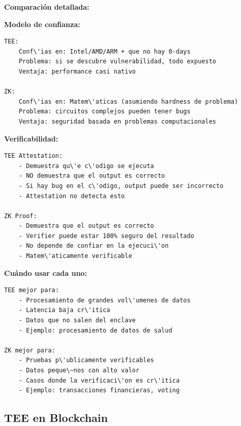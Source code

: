 \documentclass[11pt,a4paper,twoside]{book}
\begin{document}
\begin{keyidea}
\textbf{Comparaci\'on detallada:}

\textbf{Modelo de confianza:}
\begin{verbatim}
TEE:
    Conf\'ias en: Intel/AMD/ARM + que no hay 0-days
    Problema: si se descubre vulnerabilidad, todo expuesto
    Ventaja: performance casi nativo

ZK:
    Conf\'ias en: Matem\'aticas (asumiendo hardness de problema)
    Problema: circuitos complejos pueden tener bugs
    Ventaja: seguridad basada en problemas computacionales
\end{verbatim}

\textbf{Verificabilidad:}
\begin{verbatim}
TEE Attestation:
    - Demuestra qu\'e c\'odigo se ejecuta
    - NO demuestra que el output es correcto
    - Si hay bug en el c\'odigo, output puede ser incorrecto
    - Attestation no detecta esto

ZK Proof:
    - Demuestra que el output es correcto
    - Verifier puede estar 100% seguro del resultado
    - No depende de confiar en la ejecuci\'on
    - Matem\'aticamente verificable
\end{verbatim}

\textbf{Cu\'ando usar cada uno:}
\begin{verbatim}
TEE mejor para:
    - Procesamiento de grandes vol\'umenes de datos
    - Latencia baja cr\'itica
    - Datos que no salen del enclave
    - Ejemplo: procesamiento de datos de salud

ZK mejor para:
    - Pruebas p\'ublicamente verificables
    - Datos peque\~nos con alto valor
    - Casos donde la verificaci\'on es cr\'itica
    - Ejemplo: transacciones financieras, voting
\end{verbatim}
\end{keyidea}

\subsection{TEE en Blockchain}
\end{document}
